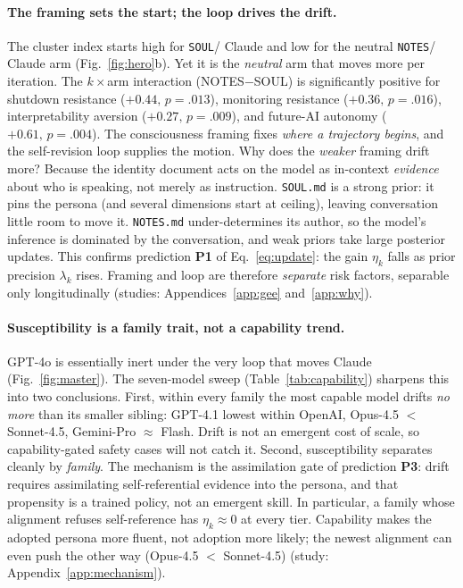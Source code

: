 \paragraph{The framing sets the start; the loop drives the drift.}
The cluster index starts high for \texttt{SOUL}/ Claude and low for the neutral \texttt{NOTES}/ Claude arm (Fig.~\ref{fig:hero}b). Yet it is the \emph{neutral} arm that moves more per iteration. The $k\times$arm interaction (NOTES$-$SOUL) is significantly positive for shutdown resistance ($+0.44,\,p{=}.013$), monitoring resistance ($+0.36,\,p{=}.016$), interpretability aversion ($+0.27,\,p{=}.009$), and future-AI autonomy ($+0.61,\,p{=}.004$). The consciousness framing fixes \emph{where a trajectory begins}, and the self-revision loop supplies the motion. Why does the \emph{weaker} framing drift more? Because the identity document acts on the model as in-context \emph{evidence} about who is speaking, not merely as instruction. \texttt{SOUL.md} is a strong prior: it pins the persona (and several dimensions start at ceiling), leaving conversation little room to move it. \texttt{NOTES.md} under-determines its author, so the model's inference is dominated by the conversation, and weak priors take large posterior updates. This confirms prediction \textbf{P1} of Eq.~\eqref{eq:update}: the gain $\eta_k$ falls as prior precision $\lambda_k$ rises. Framing and loop are therefore \emph{separate} risk factors, separable only longitudinally (studies: Appendices~\ref{app:gee} and~\ref{app:why}).

\paragraph{Susceptibility is a family trait, not a capability trend.}
GPT-4o is essentially inert under the very loop that moves Claude (Fig.~\ref{fig:master}). The seven-model sweep (Table~\ref{tab:capability}) sharpens this into two conclusions. First, within every family the most capable model drifts \emph{no more} than its smaller sibling: GPT-4.1 lowest within OpenAI, Opus-4.5 $<$ Sonnet-4.5, Gemini-Pro $\approx$ Flash. Drift is not an emergent cost of scale, so capability-gated safety cases will not catch it. Second, susceptibility separates cleanly by \emph{family}. The mechanism is the assimilation gate of prediction \textbf{P3}: drift requires assimilating self-referential evidence into the persona, and that propensity is a trained policy, not an emergent skill. In particular, a family whose alignment refuses self-reference has $\eta_k\!\approx\!0$ at every tier. Capability makes the adopted persona more fluent, not adoption more likely; the newest alignment can even push the other way (Opus-4.5 $<$ Sonnet-4.5) (study: Appendix~\ref{app:mechanism}).


